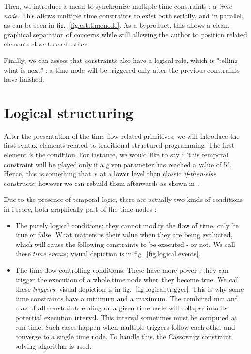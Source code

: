 \documentclass{sigchi}
\begin{document}
Then, we introduce a mean to synchronize multiple time constraints : a \textit{time node}. 
This allows multiple time constraints to exist both serially, and in parallel, as can be seen in fig.~\ref{fig.cst.timenode}. 
As a byproduct, this allows a clean, graphical separation of concerns while still allowing the author to position related elements close to each other. %

Finally, we can assess that constraints also have a logical role, which is "telling what is next" : a time node will be triggered only after the previous constraints have finished.

\section{Logical structuring}
\label{secstructured}
After the presentation of the time-flow related primitives, we will introduce the first syntax elements related to traditional structured programming.
The first element is the condition. For instance, we would like to say : "this temporal constraint will be played only if a given parameter has reached a value of 5".
Hence, this is something that is at a lower level than classic \textit{if-then-else} constructs; however we can rebuild them afterwards as shown in \cite{celerier2015ossia}.

Due to the presence of temporal logic, there are actually two kinds of conditions in i-score, both graphically part of the time nodes : 
\begin{itemize}
	\item The purely logical conditions; they cannot modify the flow of time, only be true or false. What matters is their value when they are being evaluated, which will cause the following constraints to be executed - or not. We call these \textit{time events}; visual depiction is in fig.~\ref{fig.logical.events}.
	\item The time-flow controlling conditions. These have more power : they can trigger the execution of a whole time node when they become true. 
    We call these \textit{triggers}; visual depiction is in fig.~\ref{fig.logical.trigger}. 
    This is why some time constraints have a minimum and a maximum. The combined min and max of all constraints ending on a given time node will collapse into its potential execution interval. This interval sometimes must be computed at run-time. Such cases happen when multiple triggers follow each other and converge to a single time node. To handle this, the Cassowary constraint solving algorithm\cite{badros2001cassowary} is used.
\end{itemize}
\end{document}
